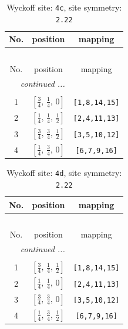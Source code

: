 \documentclass[fleqn,8pt]{jsarticle}
\begin{document}
\renewcommand{\arraystretch}{1.2}
\begin{longtable}{ccc}
\caption{Wyckoff site: {\tt 4c}, site symmetry: {\tt 2.22}}
 \\
 \hline \hline
No. & position & mapping \\ \hline \endfirsthead

\multicolumn{2}{l}{\tablename\ \thetable{}} \\
 \hline \hline
No. & position & mapping \\ \hline \endhead

 \hline \hline
\multicolumn{2}{r}{\footnotesize\it continued ...} \\ \endfoot

 \hline \hline
\multicolumn{2}{r}{} \\ \endlastfoot

1 & $\left[ \frac{3}{4},\, \frac{1}{4},\, 0 \right]$ & {\tt [1,8,14,15]} \\ \hline
2 & $\left[ \frac{1}{4},\, \frac{1}{4},\, \frac{1}{2} \right]$ & {\tt [2,4,11,13]} \\ \hline
3 & $\left[ \frac{3}{4},\, \frac{3}{4},\, \frac{1}{2} \right]$ & {\tt [3,5,10,12]} \\ \hline
4 & $\left[ \frac{1}{4},\, \frac{3}{4},\, 0 \right]$ & {\tt [6,7,9,16]} \\
\end{longtable}
\renewcommand{\arraystretch}{1.2}
\begin{longtable}{ccc}
\caption{Wyckoff site: {\tt 4d}, site symmetry: {\tt 2.22}}
 \\
 \hline \hline
No. & position & mapping \\ \hline \endfirsthead

\multicolumn{2}{l}{\tablename\ \thetable{}} \\
 \hline \hline
No. & position & mapping \\ \hline \endhead

 \hline \hline
\multicolumn{2}{r}{\footnotesize\it continued ...} \\ \endfoot

 \hline \hline
\multicolumn{2}{r}{} \\ \endlastfoot

1 & $\left[ \frac{3}{4},\, \frac{1}{4},\, \frac{1}{2} \right]$ & {\tt [1,8,14,15]} \\ \hline
2 & $\left[ \frac{1}{4},\, \frac{1}{4},\, 0 \right]$ & {\tt [2,4,11,13]} \\ \hline
3 & $\left[ \frac{3}{4},\, \frac{3}{4},\, 0 \right]$ & {\tt [3,5,10,12]} \\ \hline
4 & $\left[ \frac{1}{4},\, \frac{3}{4},\, \frac{1}{2} \right]$ & {\tt [6,7,9,16]} \\
\end{longtable}
\end{document}
